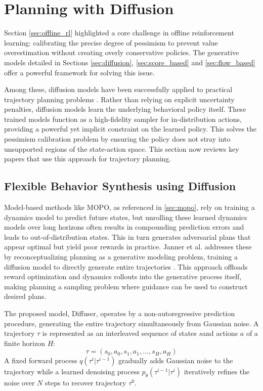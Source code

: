 \section{Planning with Diffusion}
\label{sec:planning}
Section \ref{sec:offline_rl} highlighted a core challenge in offline reinforcement learning: calibrating the precise degree of pessimism to prevent value overestimation without creating overly conservative policies. The generative models detailed in Sections \ref{sec:diffusion}, \ref{sec:score_based} and \ref{sec:flow_based} offer a powerful framework for solving this issue.

Among these, diffusion models have been successfully applied to practical trajectory planning problems \cite{jannerPlanningDiffusionFlexible2022, chiDiffusionPolicyVisuomotor2023}. Rather than relying on explicit uncertainty penalties,  diffusion models learn the underlying behavioral policy itself. These trained models function as a high-fidelity sampler for in-distribution actions, providing a powerful yet implicit constraint on the learned policy. This solves the pessimism calibration problem by ensuring the policy does not stray into unsupported regions of the state-action space. This section now reviews key papers that use this approach for trajectory planning.


\subsection{Flexible Behavior Synthesis using Diffusion}
Model-based methods like MOPO, as referenced in \ref{sec:mopo}, rely on training a dynamics model to predict future states, but unrolling these learned dynamics models over long horizons often results in compounding prediction errors and leads to out-of-distribution states. This in turn generates adversarial plans that appear optimal but yield poor rewards in practice. Janner et al. addresses these by reconceptualizing planning as a generative modeling problem, training a diffusion model to directly generate entire trajectories \cite{jannerPlanningDiffusionFlexible2022}. This approach offloads reward optimization and dynamics rollouts into the generative process itself, making planning a sampling problem where guidance can be used to construct desired plans.

The proposed model, Diffuser, operates by a non-autoregressive prediction procedure, generating the entire trajectory simultaneously from Gaussian noise. A trajectory $\tau$ is represented as an interleaved sequence of states $s$and actions $a$ of a finite horizon $H$:
\begin{equation}
	\tau = (s_0, a_0,s_1, a_1,\dots, s_H, a_H)
\end{equation}
A fixed forward process $q(\tau^i | \tau^{i-1})$  gradually adds Gaussian noise to the trajectory while a learned denoising process $p_{\theta}(\tau^{i-1} | \tau^{i})$ iteratively refines the noise over $N$ steps to recover trajectory $\tau^0.$ 

